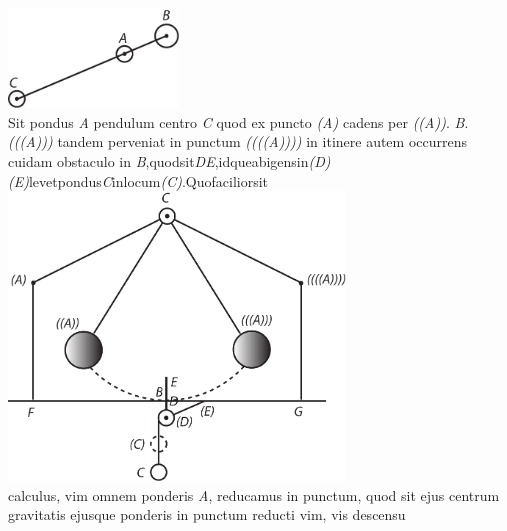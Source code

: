  \pstart
 \centering
    \includegraphics[trim = 0mm -2mm 0mm 0mm, clip, width=0.34\textwidth]{images/lh03705126r-1}\\
   \noindent {}%
    \pend
    \vspace{1em}
 \pstart\noindent Sit pondus \textit{A} pendulum centro \textit{C}  quod ex puncto \textit{(A)} cadens per \textit{((A))}. \textit{B}. \textit{(((A)))} tandem perveniat in punctum \textit{((((A))))} in   itinere autem occurrens cuidam obstaculo in \textit{B},\hfill quod\hfill sit\hfill \textit{DE},\hfill idque\hfill abigens\hfill in\hfill \textit{(D)(E)}\hfill levet\hfill pondus\hfill \textit{C}\hfill in\hfill locum\hfill \textit{(C)}.\hfill Quo\hfill facilior\hfill sit
 \pend
 \newpage
  \pstart   \centering                    
                \includegraphics[trim = 0mm -4mm 0mm 0mm, clip, width=0.67\textwidth]{images/lh03705126r-2}\\
 \pend
\vspace{1.5em}
  \pstart\noindent calculus, vim omnem ponderis \textit{A},   reducamus in punctum, quod sit ejus centrum gravitatis  ejusque ponderis in punctum reducti vim, 
%
vis descensu
